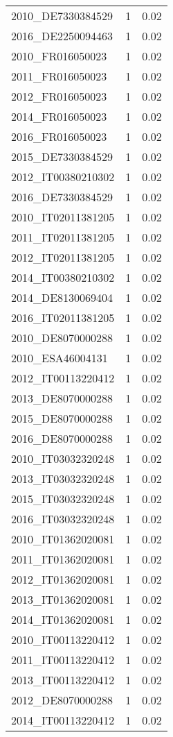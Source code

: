 \begin{table*}[htbp]
\begin{tabular}{lrr}
2010_DE7330384529 & 1 & 0.02 \\
2016_DE2250094463 & 1 & 0.02 \\
2010_FR016050023 & 1 & 0.02 \\
2011_FR016050023 & 1 & 0.02 \\
2012_FR016050023 & 1 & 0.02 \\
2014_FR016050023 & 1 & 0.02 \\
2016_FR016050023 & 1 & 0.02 \\
2015_DE7330384529 & 1 & 0.02 \\
2012_IT00380210302 & 1 & 0.02 \\
2016_DE7330384529 & 1 & 0.02 \\
2010_IT02011381205 & 1 & 0.02 \\
2011_IT02011381205 & 1 & 0.02 \\
2012_IT02011381205 & 1 & 0.02 \\
2014_IT00380210302 & 1 & 0.02 \\
2014_DE8130069404 & 1 & 0.02 \\
2016_IT02011381205 & 1 & 0.02 \\
2010_DE8070000288 & 1 & 0.02 \\
2010_ESA46004131 & 1 & 0.02 \\
2012_IT00113220412 & 1 & 0.02 \\
2013_DE8070000288 & 1 & 0.02 \\
2015_DE8070000288 & 1 & 0.02 \\
2016_DE8070000288 & 1 & 0.02 \\
2010_IT03032320248 & 1 & 0.02 \\
2013_IT03032320248 & 1 & 0.02 \\
2015_IT03032320248 & 1 & 0.02 \\
2016_IT03032320248 & 1 & 0.02 \\
2010_IT01362020081 & 1 & 0.02 \\
2011_IT01362020081 & 1 & 0.02 \\
2012_IT01362020081 & 1 & 0.02 \\
2013_IT01362020081 & 1 & 0.02 \\
2014_IT01362020081 & 1 & 0.02 \\
2010_IT00113220412 & 1 & 0.02 \\
2011_IT00113220412 & 1 & 0.02 \\
2013_IT00113220412 & 1 & 0.02 \\
2012_DE8070000288 & 1 & 0.02 \\
2014_IT00113220412 & 1 & 0.02 \\

\end{tabular}
\end{table*}
